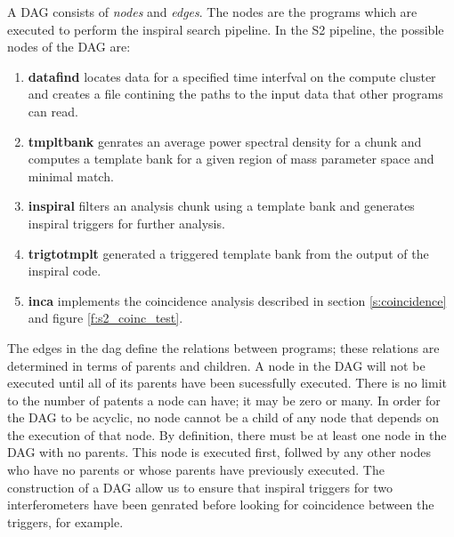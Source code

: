 A DAG consists of \emph{nodes} and \emph{edges}. The nodes are the programs
which are executed to perform the inspiral search pipeline. In the S2
pipeline, the possible nodes of the DAG are:
\begin{enumerate}
\item \textbf{datafind} locates data for a specified time interfval on the compute
cluster and creates a file contining the paths to the input data that other
programs can read.

\item\textbf{tmpltbank} genrates an average power spectral density for a chunk and
computes a template bank for a given region of mass parameter space and
minimal match.

\item\textbf{inspiral} filters an analysis chunk using a template bank and generates 
inspiral triggers for further analysis.

\item\textbf{trigtotmplt} generated a triggered template bank from the output of the
inspiral code.

\item\textbf{inca} implements the coincidence analysis described in section
\ref{s:coincidence} and figure \ref{f:s2_coinc_test}.
\end{enumerate}
The edges in the dag define the relations between programs; these relations
are determined in terms of parents and children. A node in the DAG will not be
executed until all of its parents have been sucessfully executed. There is no
limit to the number of patents a node can have; it may be zero or many. In
order for the DAG to be acyclic, no node cannot be a child of any node that
depends on the execution of that node. By definition, there must be at least
one node in the DAG with no parents. This node is executed first, follwed by
any other nodes who have no parents or whose parents have previously executed.
The construction of a DAG allow us to ensure that inspiral triggers for two
interferometers have been genrated before looking for coincidence between
the triggers, for example.

